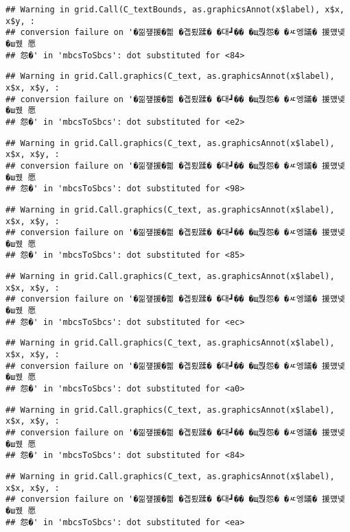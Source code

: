 \documentclass[
]{article}
\begin{document}
\begin{verbatim}
## Warning in grid.Call(C_textBounds, as.graphicsAnnot(x$label), x$x, x$y, :
## conversion failure on '�낆쟾援�쁾 �곕룄蹂� �대┛�� �щ쭩怨� �ㅼ엥議� 援먰넻�ш퀬 愿
## 怨�' in 'mbcsToSbcs': dot substituted for <84>
\end{verbatim}

\begin{verbatim}
## Warning in grid.Call.graphics(C_text, as.graphicsAnnot(x$label), x$x, x$y, :
## conversion failure on '�낆쟾援�쁾 �곕룄蹂� �대┛�� �щ쭩怨� �ㅼ엥議� 援먰넻�ш퀬 愿
## 怨�' in 'mbcsToSbcs': dot substituted for <e2>
\end{verbatim}

\begin{verbatim}
## Warning in grid.Call.graphics(C_text, as.graphicsAnnot(x$label), x$x, x$y, :
## conversion failure on '�낆쟾援�쁾 �곕룄蹂� �대┛�� �щ쭩怨� �ㅼ엥議� 援먰넻�ш퀬 愿
## 怨�' in 'mbcsToSbcs': dot substituted for <98>
\end{verbatim}

\begin{verbatim}
## Warning in grid.Call.graphics(C_text, as.graphicsAnnot(x$label), x$x, x$y, :
## conversion failure on '�낆쟾援�쁾 �곕룄蹂� �대┛�� �щ쭩怨� �ㅼ엥議� 援먰넻�ш퀬 愿
## 怨�' in 'mbcsToSbcs': dot substituted for <85>
\end{verbatim}

\begin{verbatim}
## Warning in grid.Call.graphics(C_text, as.graphicsAnnot(x$label), x$x, x$y, :
## conversion failure on '�낆쟾援�쁾 �곕룄蹂� �대┛�� �щ쭩怨� �ㅼ엥議� 援먰넻�ш퀬 愿
## 怨�' in 'mbcsToSbcs': dot substituted for <ec>
\end{verbatim}

\begin{verbatim}
## Warning in grid.Call.graphics(C_text, as.graphicsAnnot(x$label), x$x, x$y, :
## conversion failure on '�낆쟾援�쁾 �곕룄蹂� �대┛�� �щ쭩怨� �ㅼ엥議� 援먰넻�ш퀬 愿
## 怨�' in 'mbcsToSbcs': dot substituted for <a0>
\end{verbatim}

\begin{verbatim}
## Warning in grid.Call.graphics(C_text, as.graphicsAnnot(x$label), x$x, x$y, :
## conversion failure on '�낆쟾援�쁾 �곕룄蹂� �대┛�� �щ쭩怨� �ㅼ엥議� 援먰넻�ш퀬 愿
## 怨�' in 'mbcsToSbcs': dot substituted for <84>
\end{verbatim}

\begin{verbatim}
## Warning in grid.Call.graphics(C_text, as.graphicsAnnot(x$label), x$x, x$y, :
## conversion failure on '�낆쟾援�쁾 �곕룄蹂� �대┛�� �щ쭩怨� �ㅼ엥議� 援먰넻�ш퀬 愿
## 怨�' in 'mbcsToSbcs': dot substituted for <ea>
\end{verbatim}
\end{document}
